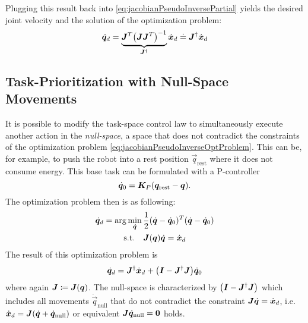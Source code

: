				Plugging this result back into \eqref{eq:jacobianPseudoInversePartial} yields the desired joint velocity and the solution of the optimization problem:
				\begin{equation*}
					\dot{\bm{q}}_d
					= \underbrace{\bm{J}^T \big( \bm{J} \bm{J}^T \big)^{-1}}_{\bm{J}^\dagger} \dot{\bm{x}}_d
					\doteq \bm{J}^\dagger \dot{\bm{x}}_d
				\end{equation*}

		\subsection{Task-Prioritization with Null-Space Movements}
			It is possible to modify the task-space control law to simultaneously execute another action in the \emph{null-space}, a space that does not contradict the constraints of the optimization problem \eqref{eq:jacobianPseudoInverseOptProblem}. This can be, for example, to push the robot into a rest position \( \vec{q}_\mathrm{rest} \) where it does not consume energy. This base task can be formulated with a P-controller
			\begin{equation*}
				\dot{\bm{q}}_0 = \bm{K}_P (\bm{q}_\mathrm{rest} - \bm{q}).
			\end{equation*}
			The optimization problem then is as following:
			\begin{equation*}
				\begin{aligned}
					\dot{\bm{q}}_d = \arg\min_{\dot{\bm{q}}} \, & \frac{1}{2} (\dot{\bm{q}} - \dot{\bm{q}}_0)^T (\dot{\bm{q}} - \dot{\bm{q}}_0) \\
					\mathrm{s.t.} \quad                           &
					\begin{aligned}[t]
						\bm{J}(\bm{q}) \dot{\bm{q}} & = \dot{\bm{x}}_d
					\end{aligned}
				\end{aligned}
			\end{equation*}
			The result of this optimization problem is
			\begin{equation*}
				\dot{\bm{q}}_d = \bm{J}^\dagger \dot{\bm{x}}_d + \big( \bm{I} - \bm{J}^\dagger \bm{J} \big) \dot{\bm{q}}_0
			\end{equation*}
			where again \( \bm{J} \coloneqq \bm{J}(\bm{q}) \). The null-space is characterized by \( \big( \bm{I} - \bm{J}^\dagger \bm{J} \big) \) which includes all movements \( \dot{\vec{q}}_\mathrm{null} \) that do not contradict the constraint \( \bm{J} \dot{\bm{q}} = \dot{\bm{x}}_d \), i.e. \( \dot{\bm{x}}_d = \bm{J} (\dot{\bm{q}} + \dot{\bm{q}}_\mathrm{null}) \) or equivalent \( \bm{J} \dot{\bm{q}}_\mathrm{null} = \bm{0} \) holds.

